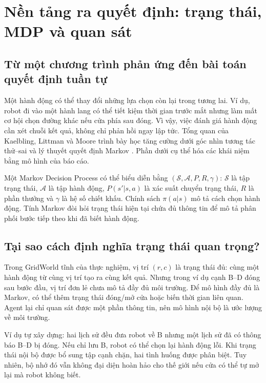 \newpage
\section{Nền tảng ra quyết định: trạng thái, MDP và quan sát}
\subsection{Từ một chương trình phản ứng đến bài toán quyết định tuần tự}
Một hành động có thể thay đổi những lựa chọn còn lại trong tương lai. Ví dụ, robot đi
vào một hành lang có thể tiết kiệm thời gian trước mắt nhưng làm mất cơ hội chọn đường
khác nếu cửa phía sau đóng. Vì vậy, việc đánh giá hành động cần xét chuỗi kết quả,
không chỉ phản hồi ngay lập tức. Tổng quan của Kaelbling, Littman và Moore trình bày
học tăng cường dưới góc nhìn tương tác thử--sai và lý thuyết quyết định Markov
\cite{rlsurvey}. Phần dưới cụ thể hóa các khái niệm bằng mô hình của báo cáo.

Một Markov Decision Process có thể biểu diễn bằng $(\mathcal S,\mathcal A,P,R,\gamma)$:
$\mathcal S$ là tập trạng thái, $\mathcal A$ là tập hành động, $P(s'|s,a)$ là xác suất
chuyển trạng thái, $R$ là phần thưởng và $\gamma$ là hệ số chiết khấu. Chính sách
$\pi(a|s)$ mô tả cách chọn hành động. Tính Markov đòi hỏi trạng thái hiện tại chứa đủ
thông tin để mô tả phân phối bước tiếp theo khi đã biết hành động.

\subsection{Tại sao cách định nghĩa trạng thái quan trọng?}
Trong GridWorld tĩnh của thực nghiệm, vị trí $(r,c)$ là trạng thái đủ: cùng một hành
động từ cùng vị trí tạo ra cùng kết quả. Nhưng trong ví dụ cạnh B--D đóng sau bước
đầu, vị trí đơn lẻ chưa mô tả đầy đủ môi trường. Để mô hình đầy đủ là Markov, có thể
thêm trạng thái đóng/mở cửa hoặc biến thời gian liên quan. Agent lại chỉ quan sát
được một phần thông tin, nên mô hình nội bộ là ước lượng về môi trường.

Ví dụ tự xây dựng: hai lịch sử đều đưa robot về B nhưng một lịch sử đã có thông báo
B--D bị đóng. Nếu chỉ lưu B, robot có thể chọn lại hành động lỗi. Khi trạng thái nội
bộ được bổ sung tập cạnh chặn, hai tình huống được phân biệt. Tuy nhiên, bộ nhớ đó vẫn
không đại diện hoàn hảo cho thế giới nếu cửa có thể tự mở lại mà robot không biết.

